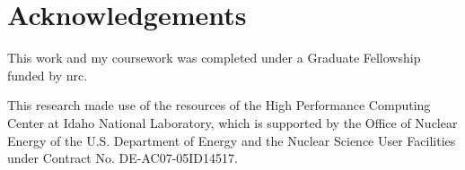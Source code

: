    \chapter{Acknowledgements}
   This work and my coursework was completed under a Graduate Fellowship funded by \acf{nrc}.
   
   This research made use of the resources of the High Performance Computing Center at Idaho National Laboratory, which is supported by the Office of Nuclear Energy of the U.S. Department of Energy and the Nuclear Science User Facilities under Contract No. DE-AC07-05ID14517.

